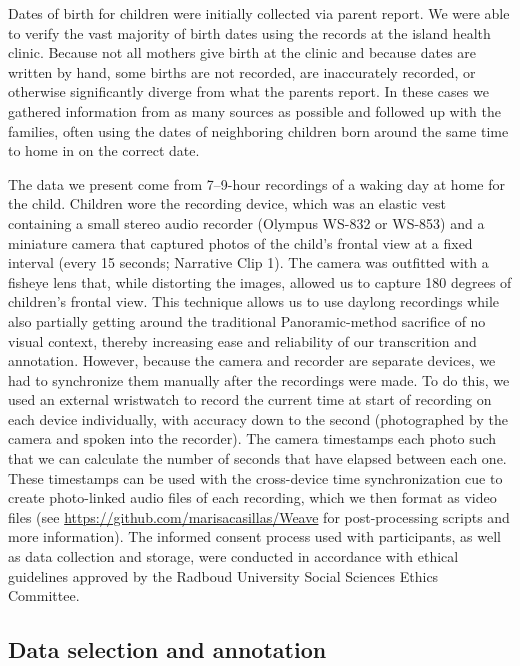 \documentclass[,man,floatsintext]{apa6}
\begin{document}
Dates of birth for children were initially collected via parent report.
We were able to verify the vast majority of birth dates using the
records at the island health clinic. Because not all mothers give birth
at the clinic and because dates are written by hand, some births are not
recorded, are inaccurately recorded, or otherwise significantly diverge
from what the parents report. In these cases we gathered information
from as many sources as possible and followed up with the families,
often using the dates of neighboring children born around the same time
to home in on the correct date.

The data we present come from 7--9-hour recordings of a waking day at
home for the child. Children wore the recording device, which was an
elastic vest containing a small stereo audio recorder (Olympus WS-832 or
WS-853) and a miniature camera that captured photos of the child's
frontal view at a fixed interval (every 15 seconds; Narrative Clip 1).
The camera was outfitted with a fisheye lens that, while distorting the
images, allowed us to capture 180 degrees of children's frontal view.
This technique allows us to use daylong recordings while also partially
getting around the traditional Panoramic-method sacrifice of no visual
context, thereby increasing ease and reliability of our transcrition and
annotation. However, because the camera and recorder are separate
devices, we had to synchronize them manually after the recordings were
made. To do this, we used an external wristwatch to record the current
time at start of recording on each device individually, with accuracy
down to the second (photographed by the camera and spoken into the
recorder). The camera timestamps each photo such that we can calculate
the number of seconds that have elapsed between each one. These
timestamps can be used with the cross-device time synchronization cue to
create photo-linked audio files of each recording, which we then format
as video files (see \url{https://github.com/marisacasillas/Weave} for
post-processing scripts and more information). The informed consent
process used with participants, as well as data collection and storage,
were conducted in accordance with ethical guidelines approved by the
Radboud University Social Sciences Ethics Committee.

\subsection{Data selection and annotation}\label{methods-samples}
\end{document}
